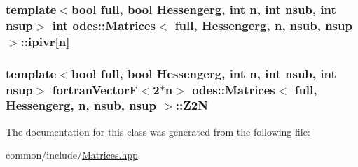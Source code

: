 \subsubsection[{ipivr}]{\setlength{\rightskip}{0pt plus 5cm}template$<$bool full, bool Hessengerg, int n, int nsub, int nsup$>$ int {\bf odes\+::\+Matrices}$<$ full, Hessengerg, n, nsub, nsup $>$\+::ipivr\mbox{[}n\mbox{]}\hspace{0.3cm}{\ttfamily [private]}}\label{classodes_1_1Matrices_ac7c747721a0d2ca7f9b792f25ce07ea9}
\hypertarget{classodes_1_1Matrices_a812f56a1f3582a4c25271306644606f0}{}
\subsubsection[{Z2\+N}]{\setlength{\rightskip}{0pt plus 5cm}template$<$bool full, bool Hessengerg, int n, int nsub, int nsup$>$ {\bf fortran\+Vector\+F}$<$2$\ast$n$>$ {\bf odes\+::\+Matrices}$<$ full, Hessengerg, n, nsub, nsup $>$\+::Z2\+N\hspace{0.3cm}{\ttfamily [private]}}\label{classodes_1_1Matrices_a812f56a1f3582a4c25271306644606f0}


The documentation for this class was generated from the following file\+:\begin{DoxyCompactItemize}
\item 
common/include/\hyperlink{Matrices_8hpp}{Matrices.\+hpp}\end{DoxyCompactItemize}
